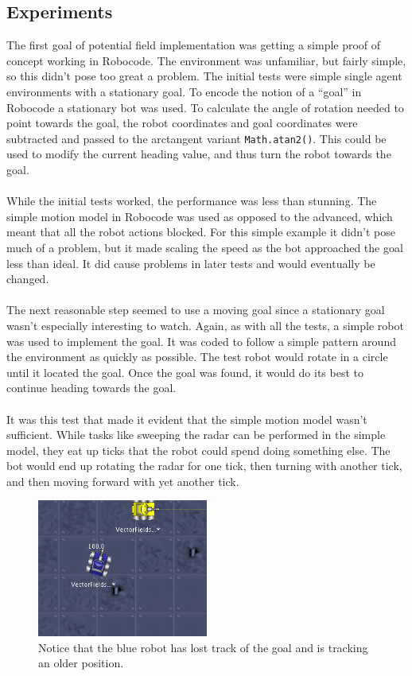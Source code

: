 \documentclass{aiaa-tc}%
\begin{document}
\subsection{Experiments}
The first goal of potential field implementation was getting a simple proof of concept working in Robocode. The environment was unfamiliar, but fairly simple, so this didn't pose too great a problem. The initial tests were simple single agent environments with a stationary goal. To encode the notion of a ``goal'' in Robocode a stationary bot was used. To calculate the angle of rotation needed to point towards the goal, the robot coordinates and goal coordinates were subtracted and passed to the arctangent variant \verb|Math.atan2()|. This could be used to modify the current heading value, and thus turn the robot towards the goal. \\ \\
While the initial tests worked, the performance was less than stunning. The simple motion model in Robocode was used as opposed to the advanced, which meant that all the robot actions blocked. For this simple example it didn't pose much of a problem, but it made scaling the speed as the bot approached the goal less than ideal. It did cause problems in later tests and would eventually be changed. \\ \\
The next reasonable step seemed to use a moving goal since a stationary goal wasn't especially interesting to watch. Again, as with all the tests, a simple robot was used to implement the goal. It was coded to follow a simple pattern around the environment as quickly as possible. The test robot would rotate in a circle until it located the goal. Once the goal was found, it would do its best to continue heading towards the goal.  \\ \\
It was this test that made it evident that the simple motion model wasn't sufficient. While tasks like sweeping the radar can be performed in the simple model, they eat up ticks that the robot could spend doing something else. The bot would end up rotating the radar for one tick, then turning with another tick, and then moving forward with yet another tick. 
\begin{figure}[htb]
\centering
\includegraphics[width=0.5\textwidth]{images/SimpleRadarFailure}
\caption{Notice that the blue robot has lost track of the goal and is tracking an older position.}
\end{figure} \\
\end{document}
